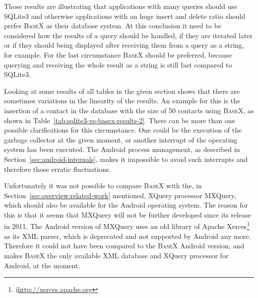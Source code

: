 Those results are illustrating that applications with many queries should use SQLite3 and otherwise applications with an huge insert and delete ratio should prefer \textsc{BaseX} as their database system.
At this conclusion it need to be considered how the results of a query should be handled, if they are iterated later or if they should being displayed after receiving them from a query as a string, for example.
For the last circumstance \textsc{BaseX} should be preferred, because querying and receiving the whole result as a string is still fast compared to SQLite3.

Looking at some results of all tables in the given section shows that there are sometimes variations in the linearity of the results.
An example for this is the insertion of a contact in the database with the size of 50 contacts using \textsc{BaseX}, as shown in Table~\ref{tab:sqlite3-vs-basex-results-2}.
There can be more than one possible clarifications for this circumstance.
One could be the execution of the garbage collector at the given moment, or another interrupt of the operating system has been executed.
The Android process management, as described in Section~\ref{sec:android-internals}, makes it impossible to avoid such interrupts and therefore those erratic fluctuations. 


Unfortunately it was not possible to compare \textsc{BaseX} with the, in Section~\ref{sec:overview:related-work} mentioned, XQuery processor MXQuery, which should also be available for the Android operating system.
The reason for this is that it seems that MXQuery will not be further developed since its release in 2011.
The Android version of MXQuery uses an old library of Apache Xerces\footnote{i\url{http://xerces.apache.org}} as its XML parser, which is deprecated and not supported by Android any more.
Therefore it could not have been compared to the \textsc{BaseX} Android version, and makes \textsc{BaseX} the only available XML database and XQuery processor for Android, at the moment.

%
\newpage
